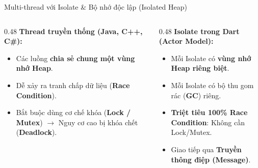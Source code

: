 \documentclass[aspectratio=169, 10pt]{beamer}
\begin{document}
\begin{frame}{Multi-thread với Isolate \& Bộ nhớ độc lập (Isolated Heap)}
  \begin{columns}[t]
    \begin{column}{0.48\textwidth}
      \textbf{Thread truyền thống (Java, C++, C\#):}
      \begin{itemize}
        \item Các luồng \textbf{chia sẻ chung một vùng nhớ Heap}.
        \item Dễ xảy ra tranh chấp dữ liệu (\textbf{Race Condition}).
        \item Bắt buộc dùng cơ chế khóa (\textbf{Lock / Mutex}) $\rightarrow$ Nguy cơ cao bị khóa chết (\textbf{Deadlock}).
      \end{itemize}
      \vspace{0.2cm}
      \centering
    \end{column}

    \begin{column}{0.48\textwidth}
      \textbf{Isolate trong Dart (Actor Model):}
      \begin{itemize}
        \item Mỗi Isolate có \textbf{vùng nhớ Heap riêng biệt}.
        \item Mỗi Isolate có bộ thu gom rác (\textbf{GC}) riêng.
        \item \textbf{Triệt tiêu 100\% Race Condition}: Không cần Lock/Mutex.
        \item Giao tiếp qua \textbf{Truyền thông điệp (Message)}.
      \end{itemize}
      \vspace{0.2cm}
      \centering
\end{column}
\end{columns}
\end{frame}
\end{document}
